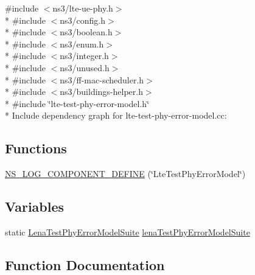 {\ttfamily \#include $<$ns3/lte-\/ue-\/phy.\+h$>$}\\*
{\ttfamily \#include $<$ns3/config.\+h$>$}\\*
{\ttfamily \#include $<$ns3/boolean.\+h$>$}\\*
{\ttfamily \#include $<$ns3/enum.\+h$>$}\\*
{\ttfamily \#include $<$ns3/integer.\+h$>$}\\*
{\ttfamily \#include $<$ns3/unused.\+h$>$}\\*
{\ttfamily \#include $<$ns3/ff-\/mac-\/scheduler.\+h$>$}\\*
{\ttfamily \#include $<$ns3/buildings-\/helper.\+h$>$}\\*
{\ttfamily \#include \char`\"{}lte-\/test-\/phy-\/error-\/model.\+h\char`\"{}}\\*
Include dependency graph for lte-\/test-\/phy-\/error-\/model.cc\+:
\subsection*{Functions}
\begin{DoxyCompactItemize}
\item 
\hyperlink{lte-test-phy-error-model_8cc_aaa6bcc9e50891bf24af58ba884847cc5}{N\+S\+\_\+\+L\+O\+G\+\_\+\+C\+O\+M\+P\+O\+N\+E\+N\+T\+\_\+\+D\+E\+F\+I\+NE} (\char`\"{}Lte\+Test\+Phy\+Error\+Model\char`\"{})
\end{DoxyCompactItemize}
\subsection*{Variables}
\begin{DoxyCompactItemize}
\item 
static \hyperlink{classLenaTestPhyErrorModelSuite}{Lena\+Test\+Phy\+Error\+Model\+Suite} \hyperlink{lte-test-phy-error-model_8cc_af868ea9de30b3c9efbbe7a14051444fa}{lena\+Test\+Phy\+Error\+Model\+Suite}
\end{DoxyCompactItemize}


\subsection{Function Documentation}
